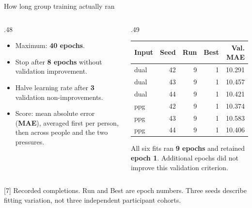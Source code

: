 \documentclass[aspectratio=169,11pt]{beamer}
\newcommand{\source}[1]{\vfill\par{\fontsize{7}{8}\selectfont\color{Muted}#1}}
\newcommand{\smalltable}{\fontsize{9}{11}\selectfont\renewcommand{\arraystretch}{1.18}}
\begin{document}
\begin{frame}{How long group training actually ran}
\begin{columns}[T]
\begin{column}{.48\textwidth}
\begin{itemize}\setlength\itemsep{3mm}
\item Maximum: \textbf{40 epochs}.
\item Stop after \textbf{8 epochs} without validation improvement.
\item Halve learning rate after \textbf{3} validation non-improvements.
\item Score: mean absolute error (\textbf{MAE}), averaged first per person, then across people and the two pressures.
\end{itemize}
\end{column}
\begin{column}{.49\textwidth}
\smalltable\begin{tabular}{lrrrr}\toprule
Input & Seed & Run & Best & Val. MAE\\\midrule
dual & 42 & 9 & 1 & 10.291\\
dual & 43 & 9 & 1 & 10.457\\
dual & 44 & 9 & 1 & 10.421\\
ppg & 42 & 9 & 1 & 10.374\\
ppg & 43 & 9 & 1 & 10.583\\
ppg & 44 & 9 & 1 & 10.406\\
\bottomrule\end{tabular}
\par\medskip\small All six fits ran \textbf{9 epochs} and retained \textbf{epoch 1}. Additional epochs did not improve this validation criterion.
\end{column}
\end{columns}
\source{[7] Recorded completions. Run and Best are epoch numbers. Three seeds describe fitting variation, not three independent participant cohorts.}
\end{frame}
\end{document}
